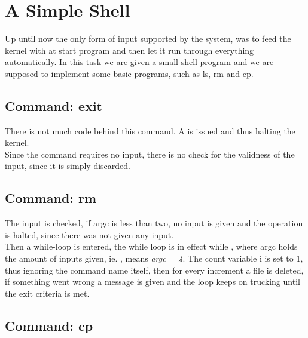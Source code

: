 %
%
%

\section{A Simple Shell}
Up until now the only form of input supported by the system, was to feed the
kernel with at start program and then let it run through everything
automatically. In this task we are given a small shell program and we are
supposed to implement some basic programs, such as ls, rm and cp.

\subsection{Command: exit}
There is not much code behind this command. A  is issued
and thus halting the kernel.\\
Since the command requires no input, there is no check for the validness of the
input, since it is simply discarded.

\subsection{Command: rm}
The input is checked, if argc is less than two, no input is given and the
operation is halted, since there was not given any input.\\
Then a while-loop is entered, the while loop is in effect while ,
where argc holds the amount of inputs given, ie. ,
means \textit{argc = 4}. The count variable i is set to 1, thus ignoring the
command name itself, then for every increment a file is deleted, if something
went wrong a message is given and the loop keeps on trucking until the exit
criteria is met. 

\subsection{Command: cp}

